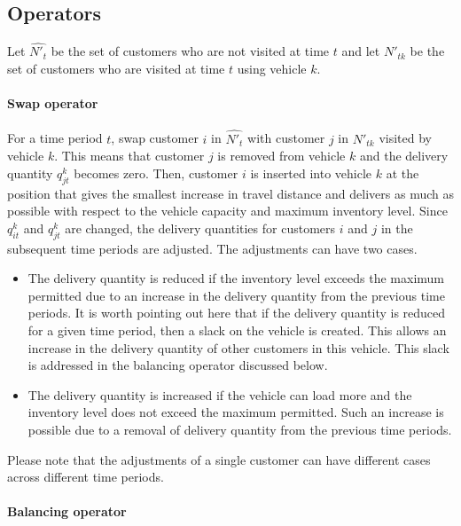 \documentclass{article}
\begin{document}
\subsection{Operators}

Let $\hat{N'_t}$ be the set of customers who are not visited at time $t$ and let $N'_{tk}$ be the set of customers who are visited at time $t$ using vehicle $k$. 

\paragraph{Swap operator} 

 For a time period $t$, swap customer $i$ in $\hat{N'_t}$ with customer $j$ in $N'_{tk}$ visited by vehicle $k$. This means that customer $j$ is removed from vehicle $k$ and the delivery quantity $q^k_{jt}$ becomes zero. Then, customer $i$ is inserted into vehicle $k$ at the position that gives the smallest increase in travel distance and delivers as much as possible with respect to the vehicle capacity and maximum inventory level. Since $q^k_{it}$ and $q^k_{jt}$ are changed, the delivery quantities for customers $i$ and $j$  in the subsequent time periods are adjusted. The adjustments can have two cases.

 \begin{itemize}
     \item [Case 1] The delivery quantity is reduced if the inventory level exceeds the maximum permitted due to an increase in the delivery quantity from the previous time periods. It is worth pointing out here that if the delivery quantity is reduced for a given time period, then a slack on the vehicle is created. This allows an increase in the delivery quantity of other customers in this vehicle. This slack is addressed in the balancing operator discussed below. 
    \item [Case 2] The delivery quantity is increased if the vehicle can load more and the inventory level does not exceed the maximum permitted. Such an increase is possible due to a removal of delivery quantity from the previous time periods.  
 \end{itemize} 
 Please note that the adjustments of a single customer can have different cases across different time periods.
 

\paragraph{Balancing operator} 
\end{document}
